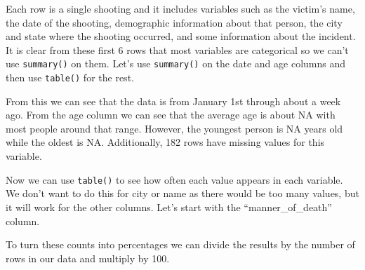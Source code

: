 \documentclass[
  12pt,
]{book}
\newenvironment{Shaded}{\begin{snugshade}}{\end{snugshade}}
\newcommand{\CommentTok}[1]{\textcolor[rgb]{0.56,0.35,0.01}{\textit{#1}}}
\newcommand{\DecValTok}[1]{\textcolor[rgb]{0.00,0.00,0.81}{#1}}
\newcommand{\KeywordTok}[1]{\textcolor[rgb]{0.13,0.29,0.53}{\textbf{#1}}}
\newcommand{\NormalTok}[1]{#1}
\newcommand{\OperatorTok}[1]{\textcolor[rgb]{0.81,0.36,0.00}{\textbf{#1}}}
\newcommand{\StringTok}[1]{\textcolor[rgb]{0.31,0.60,0.02}{#1}}
\begin{document}
Each row is a single shooting and it includes variables such as the victim's name, the date of the shooting, demographic information about that person, the city and state where the shooting occurred, and some information about the incident. It is clear from these first 6 rows that most variables are categorical so we can't use \texttt{summary()} on them. Let's use \texttt{summary()} on the date and age columns and then use \texttt{table()} for the rest.

\begin{Shaded}
\end{Shaded}

From this we can see that the data is from January 1st through about a week ago. From the age column we can see that the average age is about NA with most people around that range. However, the youngest person is NA years old while the oldest is NA. Additionally, 182 rows have missing values for this variable.

Now we can use \texttt{table()} to see how often each value appears in each variable. We don't want to do this for city or name as there would be too many values, but it will work for the other columns. Let's start with the ``manner\_of\_death'' column.

\begin{Shaded}
\end{Shaded}

To turn these counts into percentages we can divide the results by the number of rows in our data and multiply by 100.

\begin{Shaded}
\end{Shaded}
\end{document}
